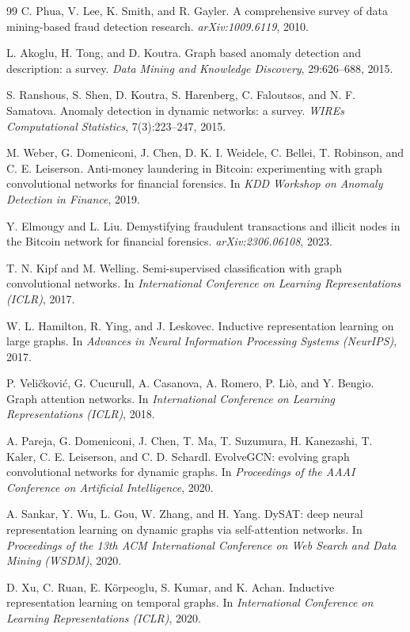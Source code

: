 \documentclass[11pt]{article}
\theoremstyle{definition}
\theoremstyle{remark}
\begin{document}
\begin{thebibliography}{99}
C. Phua, V. Lee, K. Smith, and R. Gayler.
A comprehensive survey of data mining-based fraud detection research.
\emph{arXiv:1009.6119}, 2010.

L. Akoglu, H. Tong, and D. Koutra.
Graph based anomaly detection and description: a survey.
\emph{Data Mining and Knowledge Discovery}, 29:626--688, 2015.

S. Ranshous, S. Shen, D. Koutra, S. Harenberg, C. Faloutsos, and N. F. Samatova.
Anomaly detection in dynamic networks: a survey.
\emph{WIREs Computational Statistics}, 7(3):223--247, 2015.

M. Weber, G. Domeniconi, J. Chen, D. K. I. Weidele, C. Bellei, T. Robinson, and C. E. Leiserson.
Anti-money laundering in Bitcoin: experimenting with graph convolutional networks for financial forensics.
In \emph{KDD Workshop on Anomaly Detection in Finance}, 2019.

Y. Elmougy and L. Liu.
Demystifying fraudulent transactions and illicit nodes in the Bitcoin network for financial forensics.
\emph{arXiv:2306.06108}, 2023.

T. N. Kipf and M. Welling.
Semi-supervised classification with graph convolutional networks.
In \emph{International Conference on Learning Representations (ICLR)}, 2017.

W. L. Hamilton, R. Ying, and J. Leskovec.
Inductive representation learning on large graphs.
In \emph{Advances in Neural Information Processing Systems (NeurIPS)}, 2017.

P. Veličković, G. Cucurull, A. Casanova, A. Romero, P. Liò, and Y. Bengio.
Graph attention networks.
In \emph{International Conference on Learning Representations (ICLR)}, 2018.

A. Pareja, G. Domeniconi, J. Chen, T. Ma, T. Suzumura, H. Kanezashi, T. Kaler, C. E. Leiserson, and C. D. Schardl.
EvolveGCN: evolving graph convolutional networks for dynamic graphs.
In \emph{Proceedings of the AAAI Conference on Artificial Intelligence}, 2020.

A. Sankar, Y. Wu, L. Gou, W. Zhang, and H. Yang.
DySAT: deep neural representation learning on dynamic graphs via self-attention networks.
In \emph{Proceedings of the 13th ACM International Conference on Web Search and Data Mining (WSDM)}, 2020.

D. Xu, C. Ruan, E. Körpeoglu, S. Kumar, and K. Achan.
Inductive representation learning on temporal graphs.
In \emph{International Conference on Learning Representations (ICLR)}, 2020.


\end{thebibliography}
\end{document}
